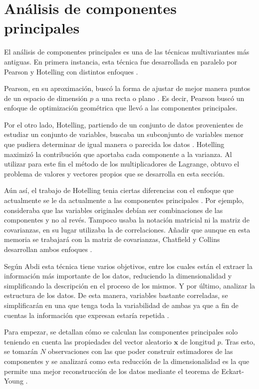 \newpage
\section{Análisis de componentes principales}
\noindent El análisis de componentes principales es una de las técnicas multivariantes más antiguas. En primera instancia, esta técnica fue desarrollada en paralelo por Pearson y Hotelling  con distintos enfoques \cite{Pearson 1901, Hotelling 1933}. 

\noindent Pearson, en su aproximación, buscó la forma de ajustar de mejor manera puntos de un espacio de dimensión $p$ a una recta o plano \cite{Pearson 1901}. Es decir, Pearson buscó un enfoque de optimización geométrica que llevó a las componentes principales.

\noindent Por el otro lado, Hotelling, partiendo de un conjunto de datos provenientes de estudiar un conjunto de variables,  buscaba un subconjunto de variables menor que pudiera determinar de igual manera o parecida los datos \cite{Hotelling 1933}. Hotelling maximizó la contribución que aportaba cada componente a la varianza. Al utilizar para este fin el método de los multiplicadores de Lagrange, obtuvo el problema de valores y vectores propios que se desarrolla en esta sección. 

\noindent Aún así, el trabajo de Hotelling tenia ciertas diferencias con el enfoque que actualmente se le da actualmente a las componentes principales \cite{Jollife 1986}. Por ejemplo, consideraba que las variables originales  debían ser combinaciones de las componentes y no al revés. Tampoco usaba la notación matricial ni la matriz de covarianzas, en su lugar utilizaba la de correlaciones. Añadir que aunque en esta memoria se trabajará con la matriz de covarianzas, Chatfield y Collins desarrollan ambos enfoques \cite{Chatfield 1989}. 

\noindent Según Abdi \cite{Abdi 2010} esta técnica tiene varios objetivos, entre los cuales están el extraer la información más importante de los datos, reduciendo la dimensionalidad y simplificando la descripción en el proceso de los mismos. Y por último, analizar la estructura de los datos.  De esta manera, variables bastante correladas, se simplificarán en una que tenga toda la variabilidad de ambas  ya que a fin de cuentas la información que expresan estaría repetida \cite{Chatfield 1989, Everitt 2011}. 

\noindent Para empezar, se detallan cómo se calculan las componentes principales solo teniendo en cuenta las propiedades del vector aleatorio $\mathbf{x}$ de longitud $p$. Tras esto, se tomarán $N$ observaciones con las que poder construir estimadores de las componentes y se analizará como esta reducción de la dimensionalidad es la que permite una mejor reconstrucción de los datos mediante el teorema de Eckart-Young \cite{Eckart 1936}. 

